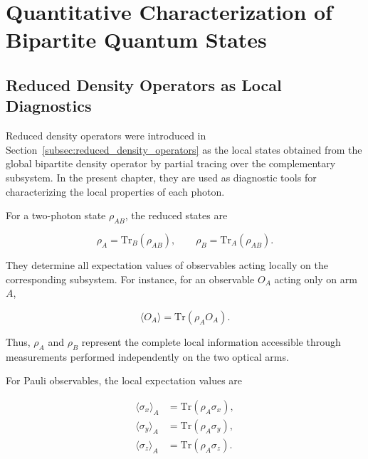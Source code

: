 
\chapter{Quantitative Characterization of Bipartite Quantum States}


\section{Reduced Density Operators as Local Diagnostics}
\label{sec:reduced_density_operators_diagnostics}

Reduced density operators were introduced in Section~\ref{subsec:reduced_density_operators} as the local states obtained from the global bipartite density operator by partial tracing over the complementary subsystem. In the present chapter, they are used as diagnostic tools for characterizing the local properties of each photon.

\medskip

For a two-photon state \( \rho_{AB} \), the reduced states are

\[
\rho_A
=
\mathrm{Tr}_B(\rho_{AB}),
\qquad
\rho_B
=
\mathrm{Tr}_A(\rho_{AB}).
\]

They determine all expectation values of observables acting locally on the corresponding subsystem. For instance, for an observable \( O_A \) acting only on arm \( A \),

\[
\langle O_A \rangle
=
\mathrm{Tr}(\rho_A O_A).
\]

Thus, \( \rho_A \) and \( \rho_B \) represent the complete local information accessible through measurements performed independently on the two optical arms.

\medskip

For Pauli observables, the local expectation values are

\begin{align}
\langle \sigma_x \rangle_A
&=
\mathrm{Tr}(\rho_A \sigma_x),
\nonumber
\\
\langle \sigma_y \rangle_A
&=
\mathrm{Tr}(\rho_A \sigma_y),
\nonumber
\\
\langle \sigma_z \rangle_A
&=
\mathrm{Tr}(\rho_A \sigma_z).
\label{eq:local_pauli_expectations_A}
\end{align}

